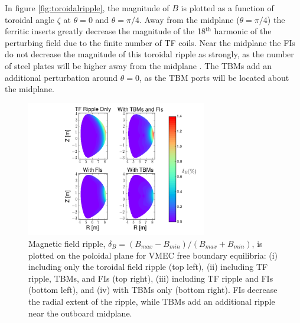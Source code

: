 \documentclass{article}
\begin{document}
In figure \ref{fig:toroidalripple}, the magnitude of $B$ is plotted as a function of toroidal angle $\zeta$ at $\theta = 0$ and $\theta = \pi/4$. Away from the midplane ($\theta = \pi/4$) the ferritic inserts greatly decrease the magnitude of the 18$^{\text{th}}$ harmonic of the perturbing field due to the finite number of TF coils. Near the midplane the FIs do not decrease the magnitude of this toroidal ripple as strongly, as the number of steel plates will be higher away from the midplane \cite{Shinohara2009}. The TBMs add an additional perturbation around $\theta = 0$, as the TBM ports will be located about the midplane. 

\FloatBarrier

\begin{figure}[h!]
\centering
\includegraphics[width=0.7\textwidth]{ripplecontour.png}
\caption{\label{fig:ripplecontour} Magnetic field ripple, $\delta_B = (B_{max}-B_{min})/(B_{max} + B_{min})$, is plotted on the poloidal plane for VMEC free boundary equilibria: (i) including only the toroidal field ripple (top left), (ii) including TF ripple, TBMs, and FIs (top right), (iii) including TF ripple and FIs (bottom left), and (iv) with TBMs only (bottom right). FIs decrease the radial extent of the ripple, while TBMs add an additional ripple near the outboard midplane.}
\end{figure}
\end{document}
